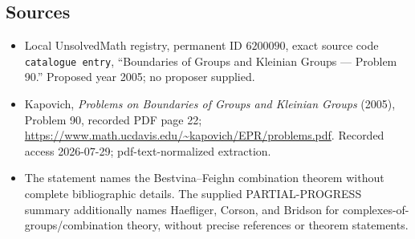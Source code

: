 \documentclass[11pt]{article}
\begin{document}
\subsection{Sources}
\begin{itemize}
\item Local UnsolvedMath registry, permanent ID \(6200090\), exact source code \texttt{catalogue entry}, ``Boundaries of Groups and Kleinian Groups --- Problem 90.'' Proposed year 2005; no proposer supplied.
\item Kapovich, \emph{Problems on Boundaries of Groups and Kleinian Groups} (2005), Problem 90, recorded PDF page 22; \url{https://www.math.ucdavis.edu/~kapovich/EPR/problems.pdf}. Recorded access 2026-07-29; pdf-text-normalized extraction.
\item The statement names the Bestvina--Feighn combination theorem without complete bibliographic details. The supplied PARTIAL-PROGRESS summary additionally names Haefliger, Corson, and Bridson for complexes-of-groups/combination theory, without precise references or theorem statements.
\end{itemize}
\end{document}

